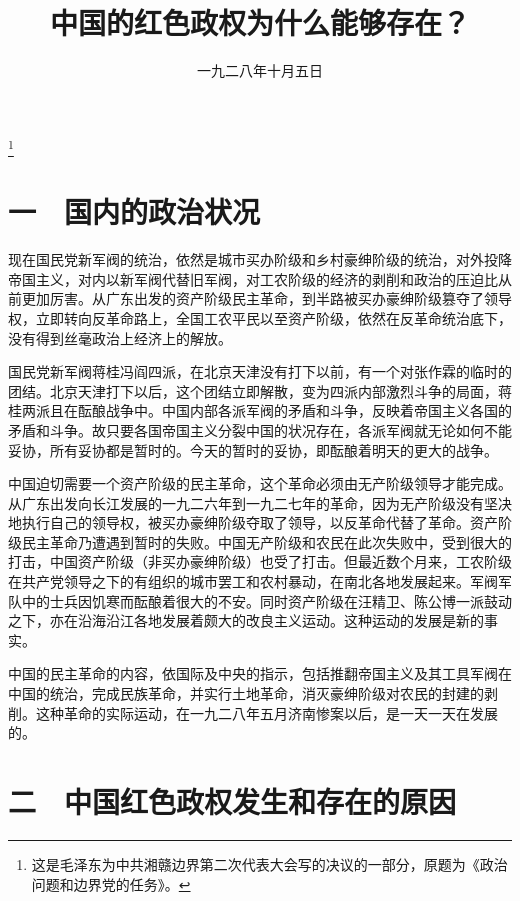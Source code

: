 
\title{中国的红色政权为什么能够存在？}
\date{一九二八年十月五日}
\thanks{这是毛泽东为中共湘赣边界第二次代表大会写的决议的一部分，原题为《政治问题和边界党的任务》。}
\maketitle


\section{一　国内的政治状况}

现在国民党新军阀的统治，依然是城市买办阶级和乡村豪绅阶级的统治，对外投降帝国主义，对内以新军阀代替旧军阀，对工农阶级的经济的剥削和政治的压迫比从前更加厉害。从广东出发的资产阶级民主革命，到半路被买办豪绅阶级篡夺了领导权，立即转向反革命路上，全国工农平民以至资产阶级，依然在反革命统治底下，没有得到丝毫政治上经济上的解放。

国民党新军阀蒋桂冯阎四派，在北京天津没有打下以前，有一个对张作霖的临时的团结。北京天津打下以后，这个团结立即解散，变为四派内部激烈斗争的局面，蒋桂两派且在酝酿战争中。中国内部各派军阀的矛盾和斗争，反映着帝国主义各国的矛盾和斗争。故只要各国帝国主义分裂中国的状况存在，各派军阀就无论如何不能妥协，所有妥协都是暂时的。今天的暂时的妥协，即酝酿着明天的更大的战争。

中国迫切需要一个资产阶级的民主革命，这个革命必须由无产阶级领导才能完成。从广东出发向长江发展的一九二六年到一九二七年的革命，因为无产阶级没有坚决地执行自己的领导权，被买办豪绅阶级夺取了领导，以反革命代替了革命。资产阶级民主革命乃遭遇到暂时的失败。中国无产阶级和农民在此次失败中，受到很大的打击，中国资产阶级（非买办豪绅阶级）也受了打击。但最近数个月来，工农阶级在共产党领导之下的有组织的城市罢工和农村暴动，在南北各地发展起来。军阀军队中的士兵因饥寒而酝酿着很大的不安。同时资产阶级在汪精卫、陈公博一派鼓动之下，亦在沿海沿江各地发展着颇大的改良主义运动。这种运动的发展是新的事实。

中国的民主革命的内容，依国际及中央的指示，包括推翻帝国主义及其工具军阀在中国的统治，完成民族革命，并实行土地革命，消灭豪绅阶级对农民的封建的剥削。这种革命的实际运动，在一九二八年五月济南惨案以后，是一天一天在发展的。

\section{二　中国红色政权发生和存在的原因}

